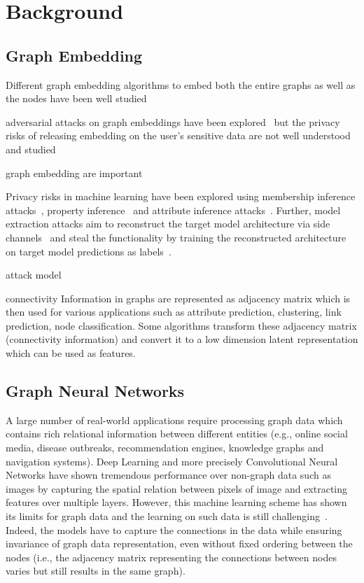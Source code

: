 \section{Background}\label{background}


\subsection{Graph Embedding}


Different graph embedding algorithms to embed both the entire graphs as well as the nodes have been well studied~\cite{node2vec,deepwalk,line,sdme,graph2vec,harp}

adversarial attacks on graph embeddings have been explored~\cite{nodepoison} but the privacy risks of releasing embedding on the user's sensitive data are not well understood and studied

graph embedding are important~\cite{tutorial}


Privacy risks in machine learning have been explored using membership inference attacks~\cite{membershipinf}, property inference~\cite{propertyinf} and attribute inference attacks~\cite{attributeinf,attributeinf2,overlearninginf}.
Further, model extraction attacks aim to reconstruct the target model architecture via side channels~\cite{csinn,timing} and steal the functionality by training the reconstructed architecture on target model predictions as labels~\cite{stealml}.

attack model~\cite{gae,vgae}

connectivity Information in graphs are represented as adjacency matrix which is then used for various applications such as attribute prediction, clustering, link prediction, node classification.
Some algorithms transform these adjacency matrix (connectivity information) and convert it to a low dimension latent representation which can be used as features.




\subsection{Graph Neural Networks}

A large number of real-world applications require processing graph data which contains rich relational information between different entities (e.g., online social media, disease outbreaks, recommendation engines, knowledge graphs and navigation systems).
Deep Learning and more precisely Convolutional Neural Networks have shown tremendous performance over non-graph data such as images by capturing the spatial relation between pixels of image and extracting features over multiple layers.
However, this machine learning scheme has shown its limits for graph data and the learning on such data is still challenging~\cite{zhou2018graph}.
Indeed, the models have to capture the connections in the data while ensuring invariance of graph data representation, even without fixed ordering between the nodes (i.e., the adjacency matrix representing the connections between nodes varies but still results in the same graph). %

